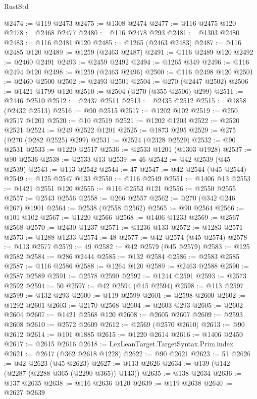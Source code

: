 \begin{lexlean}{RustStd}
\begin{coremodule}
@2474 := @119 @2473
@2475 := @1308 @2474
@2477 := @116 @2475 @120
@2478 := @2468 @2477
@2480 := @116 @2478 @293
@2481 := @1303 @2480
@2483 := @116 @2481 @120
@2485 := @1265 (@2463 @2483)
@2487 := @116 @2485 @120
@2489 := @1259 (@2463 @2487)
@2491 := @116 @2489 @120
@2492 := @2460 @2491
@2493 := @2459 @2492
@2494 := @1265 @349
@2496 := @116 @2494 @120
@2498 := @1259 (@2463 @2496)
@2500 := @116 @2498 @120
@2501 := @2460 @2500
@2502 := @2493 @2501
@2504 := @270 (@2447 @2502)
@2506 := @1421 @1799 @120
@2510 := @2504 (@270 (@355 @2506) @299)
@2511 := @2446 @2510
@2512 := @2437 @2511
@2513 := @2435 @2512
@2515 := @1858 (@2432 @2513)
@2516 := @90 @2515
@2517 := @1202 @102
@2519 := @250 @2517 @1201
@2520 := @10 @2519
@2521 := @1202 @1203
@2522 := @2520 @2521
@2524 := @249 @2522 @1201
@2525 := @1873 @295
@2529 := @275 (@270 (@282 @2525) @299)
@2531 := @2524 (@2328 @2529)
@2532 := @90 @2531
@2533 := @1220 @2517
@2536 := @2533 @1201 (@1303 @1928)
@2537 := @90 @2536
@2538 := @2533 @13
@2539 := 46
@2542 := @42 @2539 (@45 @2539)
@2543 := @113 @2542
@2544 := 47
@2547 := @42 @2544 (@45 @2544)
@2549 := @125 @2547 @133
@2550 := @116 @2549
@2551 := @1406 @13
@2553 := @1421 @2551 @120
@2555 := @116 @2553 @121
@2556 := @2550 @2555
@2557 := @2543 @2556
@2558 := @266 @2557
@2562 := @270 (@342 @246 @267) @1901
@2564 := @2538 (@2558 @2562)
@2565 := @90 @2564
@2566 := @101 @102
@2567 := @1220 @2566
@2568 := @1406 @1233
@2569 := @2567 @2568
@2570 := @2430 @1237
@2571 := @1236 @133
@2572 := @1283 @2571
@2573 := @1288 @1233
@2574 := 48
@2577 := @42 @2574 (@45 @2574)
@2578 := @113 @2577
@2579 := 49
@2582 := @42 @2579 (@45 @2579)
@2583 := @125 @2582
@2584 := @286 @2444
@2585 := @132 @2584
@2586 := @2583 @2585
@2587 := @116 @2586
@2588 := @1264 @120
@2589 := @2463 @2588
@2590 := @2587 @2589
@2591 := @2578 @2590
@2592 := @1244 @2591
@2593 := @2573 @2592
@2594 := 50
@2597 := @42 @2594 (@45 @2594)
@2598 := @113 @2597
@2599 := @132 @293
@2600 := @119 @2599
@2601 := @2598 @2600
@2602 := @1292 @2601
@2603 := @2170 @2568
@2604 := @2603 @293
@2605 := @2602 @2604
@2607 := @1421 @2568 @120
@2608 := @2605 @2607
@2609 := @2593 @2608
@2610 := @2572 @2609
@2612 := @2569 (@2570 @2610)
@2613 := @90 @2612
@2614 := @101 @1885
@2615 := @1220 @2614
@2616 := @1406 @2450
@2617 := @2615 @2616
@2618 := LexLeanTarget.TargetSyntax.Prim.index
@2621 := @2617 (@362 @2618 @1228)
@2622 := @90 @2621
@2623 := 51
@2626 := @42 @2623 (@45 @2623)
@2627 := @113 @2626
@2634 := @139 (@142 (@2287 (@2288 @365 (@2290 @365)) @143))
@2635 := @138 @2634
@2636 := @137 @2635
@2638 := @116 @2636 @120
@2639 := @119 @2638
@2640 := @2627 @2639

\end{coremodule}
\end{lexlean}
